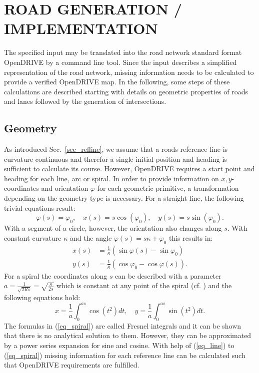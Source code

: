 \documentclass[a4paper, 10pt, conference]{ieeeconf}      %
\begin{document}
\section{ROAD GENERATION / IMPLEMENTATION}
The specified input may be translated into the road network standard format OpenDRIVE by a command line tool. Since the input describes a simplified representation of the road network, missing information needs to be calculated to provide a verified OpenDRIVE map. In the following, some steps of these calculations are described starting with details on geometric properties of roads and lanes followed by the generation of intersections. 
\subsection{Geometry}\label{sec_geometry}
	As introduced Sec.~\ref{sec_refline}, we assume that a roads reference line is curvature continuous and therefor a single initial position and heading is sufficient to calculate its course. However, OpenDRIVE requires a start point and heading for each line, arc or spiral. In order to provide information on $x,y$-coordinates and orientation $\varphi$ for each geometric primitive, a transformation depending on the geometry type is necessary. For a straight line, the following trivial equations result:
    \begin{equation}
        \varphi(s) = \varphi_0, \quad x(s) = s \cos(\varphi_0), \quad y(s) = s \sin(\varphi_0)\text{.}
        \label{eq_line}
    \end{equation}
    With a segment of a circle, however, the orientation also changes along $s$. With constant curvature $\kappa$ and the angle $\varphi(s) = s \kappa + \varphi_0$ this results in:
    \begin{equation}
    \begin{split}
        x(s) &= \frac{1}{\kappa} \left(\sin\varphi(s) - \sin\varphi_0 \right)\\
        y(s) &= \frac{1}{\kappa} \left(\cos\varphi_0 - \cos\varphi(s) \right) \text{.}
    \end{split}
    \label{eq_arc}
    \end{equation}
    For a spiral the coordinates along $s$ can be described with a parameter \(a = \frac{1}{\sqrt{2Rs}} = \sqrt{\frac{\kappa}{2s}}\) which is constant at any point of the spiral (cf. \cite{Baier.2008}) and the following equations hold: 
    \begin{equation} 
        x = \frac{1}{a}\int_0^{as}  \cos\left(t^2\right)dt, \quad y = \frac{1}{a}\int_0^{as}  \sin\left(t^2\right)dt \text{.}
        \label{eq_spiral}
    \end{equation}
	The formulas in (\ref{eq_spiral}) are called Fresnel integrals and it can be shown that there is no analytical solution to them. However, they can be approximated by a power series expansion for sine and cosine. With help of (\ref{eq_line}) to (\ref{eq_spiral}) missing information for each reference line can be calculated such that OpenDRIVE requirements are fulfilled.
\end{document}
